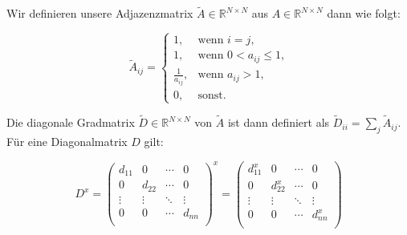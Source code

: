 \documentclass{scrartcl}
\begin{document}
Wir definieren unsere Adjazenzmatrix $\tilde A \in \mathbb{R}^{N \times N}$ aus $A \in \mathbb{R}^{N \times N}$ dann wie folgt:

\begin{equation}
  \tilde A_{ij} = \begin{cases}
    1, & \text{wenn }i=j\text{,}\\
    1, & \text{wenn }0 < a_{ij} \leq 1\text{,}\\
    \frac{1}{a_{ij}}, & \text{wenn }a_{ij} > 1\text{,}\\
    0, & \text{sonst.}
  \end{cases}
\end{equation}


Die diagonale Gradmatrix $\tilde D \in \mathbb{R}^{N \times N}$ von $\tilde A$ ist dann definiert als $\tilde D_{ii} = \sum_j \tilde A_{ij}$.
Für eine Diagonalmatrix $D$ gilt:

\begin{equation}
  D^x = \begin{pmatrix}
    d_{11} & 0 & \cdots & 0\\
    0 & d_{22} & \cdots & 0\\
    \vdots & \vdots & \ddots & \vdots\\
    0 & 0 & \cdots & d_{nn}\\
  \end{pmatrix}^x = \begin{pmatrix}
    d_{11}^x & 0 & \cdots & 0\\
    0 & d_{22}^x & \cdots & 0\\
    \vdots & \vdots & \ddots & \vdots\\
    0 & 0 & \cdots & d_{nn}^x\\
  \end{pmatrix}
\end{equation}
\end{document}
